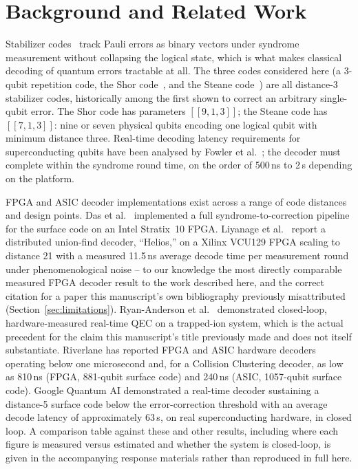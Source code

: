 \section{Background and Related Work}\label{sec:related}

Stabilizer codes~\cite{gottesman1997stabilizer} track Pauli errors as binary vectors under syndrome measurement without collapsing the logical state, which is what makes classical decoding of quantum errors tractable at all. The three codes considered here (a 3-qubit repetition code, the Shor code~\cite{shor1995scheme}, and the Steane code~\cite{steane1996error}) are all distance-3 stabilizer codes, historically among the first shown to correct an arbitrary single-qubit error. The Shor code has parameters \([[9,1,3]]\); the Steane code has \([[7,1,3]]\): nine or seven physical qubits encoding one logical qubit with minimum distance three. Real-time decoding latency requirements for superconducting qubits have been analysed by Fowler et al.~\cite{fowler2012surface}; the decoder must complete within the syndrome round time, on the order of 500\,ns to 2\,\textmu{}s depending on the platform.

FPGA and ASIC decoder implementations exist across a range of code distances and design points. Das et al.~\cite{das2022afs} implemented a full syndrome-to-correction pipeline for the surface code on an Intel Stratix~10 FPGA. Liyanage et al.~\cite{liyanage2023scalable} report a distributed union-find decoder, ``Helios,'' on a Xilinx VCU129 FPGA scaling to distance 21 with a measured 11.5\,ns average decode time per measurement round under phenomenological noise -- to our knowledge the most directly comparable measured FPGA decoder result to the work described here, and the correct citation for a paper this manuscript's own bibliography previously misattributed (Section~\ref{sec:limitations}). Ryan-Anderson et al.~\cite{ryan2021realization} demonstrated closed-loop, hardware-measured real-time QEC on a trapped-ion system, which is the actual precedent for the claim this manuscript's title previously made and does not itself substantiate. Riverlane has reported FPGA and ASIC hardware decoders operating below one microsecond and, for a Collision Clustering decoder, as low as 810\,ns (FPGA, 881-qubit surface code) and 240\,ns (ASIC, 1057-qubit surface code). Google Quantum AI demonstrated a real-time decoder sustaining a distance-5 surface code below the error-correction threshold with an average decode latency of approximately 63\,\textmu{}s, on real superconducting hardware, in closed loop. A comparison table against these and other results, including where each figure is measured versus estimated and whether the system is closed-loop, is given in the accompanying response materials rather than reproduced in full here.

